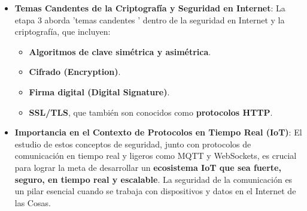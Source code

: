 \documentclass{report}
\begin{document}
\begin{itemize}
    \item \textbf{Temas Candentes de la Criptografía y Seguridad en Internet}: La etapa 3 aborda  'temas candentes ' dentro de la seguridad en Internet 
    y la criptografía, que incluyen:
    \begin{itemize}
        \item \textbf{Algoritmos de clave simétrica y asimétrica}.
        \item \textbf{Cifrado (Encryption)}.
        \item \textbf{Firma digital (Digital Signature)}.
        \item \textbf{SSL/TLS}, que también son conocidos como \textbf{protocolos HTTP}.
    \end{itemize}

    \item \textbf{Importancia en el Contexto de Protocolos en Tiempo Real (IoT)}: El estudio de estos conceptos de seguridad, junto con protocolos de 
    comunicación en tiempo real y ligeros como MQTT y WebSockets, es crucial para lograr la meta de desarrollar un \textbf{ecosistema IoT que sea fuerte, 
    seguro, en tiempo real y escalable}. La seguridad de la comunicación es un pilar esencial cuando se trabaja con dispositivos y datos en el Internet 
    de las Cosas.


\end{itemize}
\end{document}
